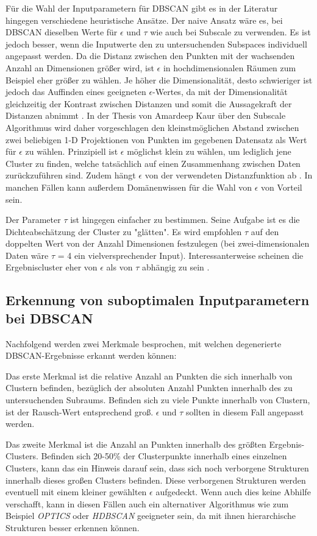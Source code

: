 \documentclass[utf8,biblatex]{lni}
\begin{document}
Für die Wahl der Inputparametern für DBSCAN gibt es in der Literatur hingegen verschiedene heuristische Ansätze.
Der naive Ansatz wäre es, bei DBSCAN dieselben Werte für $\epsilon$ und $\tau$ wie auch bei Subscale zu verwenden.
Es ist jedoch besser, wenn die Inputwerte den zu untersuchenden Subspaces individuell angepasst werden.
Da die Distanz zwischen den Punkten mit der wachsenden Anzahl an Dimensionen größer wird,
ist $\epsilon$ in hochdimensionalen Räumen zum Beispiel eher größer zu wählen.
Je höher die Dimensionalität, desto schwieriger ist jedoch das Auffinden eines geeigneten $\epsilon$-Wertes,
da mit der Dimensionalität gleichzeitig der Kontrast zwischen Distanzen und somit die Aussagekraft der Distanzen abnimmt \cite{TODS4203-19}.
In der Thesis von Amardeep Kaur über den Subscale Algorithmus \cite{THESIS} wird daher vorgeschlagen den kleinstmöglichen Abstand
zwischen zwei beliebigen 1-D Projektionen von Punkten im gegebenen Datensatz als Wert für $\epsilon$ zu wählen.
Prinzipiell ist $\epsilon$ möglichst klein zu wählen, um lediglich jene Cluster zu finden,
welche tatsächlich auf einen Zusammenhang zwischen Daten zurückzuführen sind. Zudem hängt $\epsilon$
von der verwendeten Distanzfunktion ab \cite{TODS4203-19}.
In manchen Fällen kann außerdem Domänenwissen für die Wahl von $\epsilon$ von Vorteil sein.

Der Parameter $\tau$ ist hingegen einfacher zu bestimmen.
Seine Aufgabe ist es die Dichteabschätzung der Cluster zu "glätten".
Es wird empfohlen $\tau$ auf den doppelten Wert von der Anzahl Dimensionen festzulegen (bei zwei-dimensionalen Daten
wäre $\tau$ = 4 ein vielversprechender Input).
Interessanterweise scheinen die Ergebniscluster eher von $\epsilon$ als von $\tau$ abhängig zu sein \cite{TODS4203-19}.

\subsection{Erkennung von suboptimalen Inputparametern bei DBSCAN}
Nachfolgend werden zwei Merkmale besprochen, mit welchen degenerierte DBSCAN-Ergebnisse erkannt werden können:

Das erste Merkmal ist die relative Anzahl an Punkten die sich innerhalb von Clustern befinden,
bezüglich der absoluten Anzahl Punkten innerhalb des zu untersuchenden Subraums.
Befinden sich zu viele Punkte innerhalb von Clustern, ist der Rausch-Wert entsprechend groß.
$\epsilon$ und $\tau$ sollten in diesem Fall angepasst werden.

Das zweite Merkmal ist die Anzahl an Punkten innerhalb des größten Ergebnis-Clusters.
Befinden sich 20-50\% der Clusterpunkte innerhalb eines einzelnen Clusters,
kann das ein Hinweis darauf sein, dass sich noch verborgene Strukturen innerhalb dieses großen Clusters befinden.
Diese verborgenen Strukturen werden eventuell mit einem kleiner gewählten $\epsilon$ aufgedeckt.
Wenn auch dies keine Abhilfe verschafft,
kann in diesen Fällen auch ein alternativer Algorithmus
wie zum Beispiel \emph{OPTICS} oder \emph{HDBSCAN} geeigneter sein, da mit ihnen hierarchische Strukturen besser erkennen können.
\end{document}

